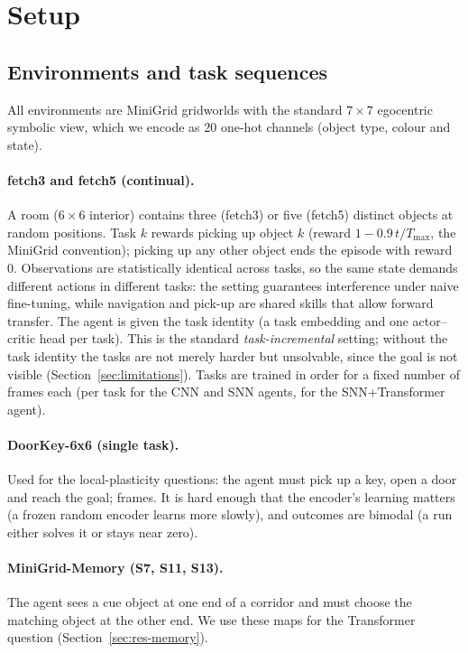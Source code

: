 \documentclass[10pt]{article}
\begin{document}
\section{Setup}
\label{sec:setup}

\subsection{Environments and task sequences}
All environments are MiniGrid \citep{chevalierboisvert2023minigrid} gridworlds with the standard $7{\times}7$
egocentric symbolic view, which we encode as 20 one-hot channels (object type, colour and state).

\paragraph{fetch3 and fetch5 (continual).} A room ($6{\times}6$ interior) contains three (fetch3) or five (fetch5)
distinct objects at random positions. Task $k$ rewards picking up object $k$ (reward $1-0.9\,t/T_{\max}$, the MiniGrid
convention); picking up any other object ends the episode with reward 0. Observations are statistically identical
across tasks, so the same state demands different actions in different tasks: the setting guarantees interference
under naive fine-tuning, while navigation and pick-up are shared skills that allow forward transfer. The agent is
given the task identity (a task embedding and one actor--critic head per task). This is the standard
\emph{task-incremental} setting; without the task identity the tasks are not merely harder but unsolvable, since the
goal is not visible (Section~\ref{sec:limitations}). Tasks are trained in order for a fixed number of frames each
(\framesPerTaskFlat per task for the CNN and SNN agents, \framesPerTaskHybrid for the SNN+Transformer agent).

\paragraph{DoorKey-6x6 (single task).} Used for the local-plasticity questions: the agent must pick up a key, open
a door and reach the goal; \framesDoorKey frames. It is hard enough that the encoder's learning matters (a frozen
random encoder learns more slowly), and outcomes are bimodal (a run either solves it or stays near zero).

\paragraph{MiniGrid-Memory (S7, S11, S13).} The agent sees a cue object at one end of a corridor and must choose the
matching object at the other end. We use these maps for the Transformer question (Section~\ref{sec:res-memory}).
\end{document}
